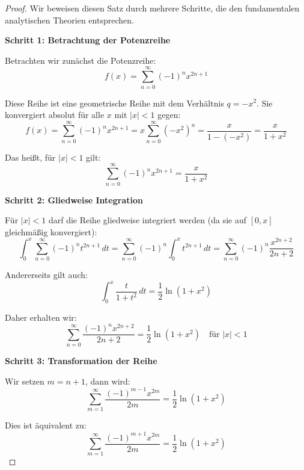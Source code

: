 \documentclass[a4paper,12pt,twoside]{report}
\theoremstyle{definition}
\begin{document}
\begin{proof}
Wir beweisen diesen Satz durch mehrere Schritte, die den fundamentalen analytischen Theorien entsprechen.

\textbf{Schritt 1: Betrachtung der Potenzreihe}

Betrachten wir zunächst die Potenzreihe:
\begin{equation}
f(x) = \sum_{n=0}^{\infty} (-1)^n x^{2n+1}
\end{equation}

Diese Reihe ist eine geometrische Reihe mit dem Verhältnis $q = -x^2$. Sie konvergiert absolut für alle $x$ mit $|x| < 1$ gegen:
\begin{equation}
f(x) = \sum_{n=0}^{\infty} (-1)^n x^{2n+1} = x \sum_{n=0}^{\infty} (-x^2)^n = \frac{x}{1 - (-x^2)} = \frac{x}{1+x^2}
\end{equation}

Das heißt, für $|x| < 1$ gilt:
\begin{equation}
\sum_{n=0}^{\infty} (-1)^n x^{2n+1} = \frac{x}{1+x^2}
\end{equation}

\textbf{Schritt 2: Gliedweise Integration}

Für $|x| < 1$ darf die Reihe gliedweise integriert werden (da sie auf $[0,x]$ gleichmäßig konvergiert):
\begin{equation}
\int_0^x \sum_{n=0}^{\infty} (-1)^n t^{2n+1} \, dt = \sum_{n=0}^{\infty} (-1)^n \int_0^x t^{2n+1} \, dt = \sum_{n=0}^{\infty} (-1)^n \frac{x^{2n+2}}{2n+2}
\end{equation}

Andererseits gilt auch:
\begin{equation}
\int_0^x \frac{t}{1+t^2} \, dt = \frac{1}{2} \ln(1+x^2)
\end{equation}

Daher erhalten wir:
\begin{equation}
\sum_{n=0}^{\infty} \frac{(-1)^n x^{2n+2}}{2n+2} = \frac{1}{2} \ln(1+x^2) \quad \text{für } |x| < 1
\end{equation}

\textbf{Schritt 3: Transformation der Reihe}

Wir setzen $m = n+1$, dann wird:
\begin{equation}
\sum_{m=1}^{\infty} \frac{(-1)^{m-1} x^{2m}}{2m} = \frac{1}{2} \ln(1+x^2)
\end{equation}

Dies ist äquivalent zu:
\begin{equation}
\sum_{m=1}^{\infty} \frac{(-1)^{m+1} x^{2m}}{2m} = \frac{1}{2} \ln(1+x^2)
\end{equation}


\end{proof}
\end{document}
